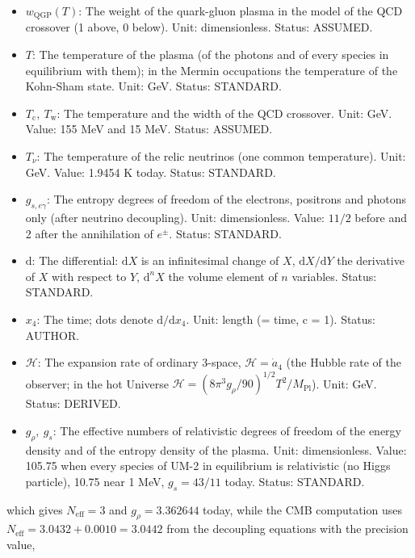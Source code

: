 \documentclass[
  10pt,
]{article}
\providecommand{\tightlist}{%
  \setlength{\itemsep}{0pt}\setlength{\parskip}{0pt}}
\begin{document}
\begin{itemize}
\tightlist
\item
  \(w_{\mathrm{QGP}}(T)\): The weight of the quark-gluon plasma in the
  model of the QCD crossover (1 above, 0 below). Unit: dimensionless.
  Status: ASSUMED.
\item
  \(T\): The temperature of the plasma (of the photons and of every
  species in equilibrium with them); in the Mermin occupations the
  temperature of the Kohn-Sham state. Unit: GeV. Status: STANDARD.
\item
  \(T_{\mathrm{c}},\ T_{\mathrm{w}}\): The temperature and the width of
  the QCD crossover. Unit: GeV. Value: 155 MeV and 15 MeV. Status:
  ASSUMED.
\item
  \(T_\nu\): The temperature of the relic neutrinos (one common
  temperature). Unit: GeV. Value: 1.9454 K today. Status: STANDARD.
\item
  \(g_{s,e\gamma}\): The entropy degrees of freedom of the electrons,
  positrons and photons only (after neutrino decoupling). Unit:
  dimensionless. Value: \(11/2\) before and 2 after the annihilation of
  \(e^\pm\). Status: STANDARD.
\item
  \(\mathrm{d}\): The differential: \(\mathrm{d}X\) is an infinitesimal
  change of \(X\), \(\mathrm{d}X/\mathrm{d}Y\) the derivative of \(X\)
  with respect to \(Y\), \(\mathrm{d}^nX\) the volume element of \(n\)
  variables. Status: STANDARD.
\item
  \(x_4\): The time; dots denote \(\mathrm{d}/\mathrm{d}x_4\). Unit:
  length (= time, c = 1). Status: AUTHOR.
\item
  \(\mathcal{H}\): The expansion rate of ordinary 3-space,
  \(\mathcal{H} = \dot a_4\) (the Hubble rate of the observer; in the
  hot Universe
  \(\mathcal{H} = (8\pi^3g_\rho/90)^{1/2}T^2/M_{\mathrm{Pl}}\)). Unit:
  GeV. Status: DERIVED.
\item
  \(g_\rho,\ g_s\): The effective numbers of relativistic degrees of
  freedom of the energy density and of the entropy density of the
  plasma. Unit: dimensionless. Value: 105.75 when every species of UM-2
  in equilibrium is relativistic (no Higgs particle), 10.75 near 1 MeV,
  \(g_s = 43/11\) today. Status: STANDARD.
\end{itemize}

which gives \(N_{\mathrm{eff}} = 3\) and \(g_\rho = 3.362644\) today,
while the CMB computation uses
\(N_{\mathrm{eff}} = 3.0432 + 0.0010 = 3.0442\) from the decoupling
equations with the precision value,
\end{document}
